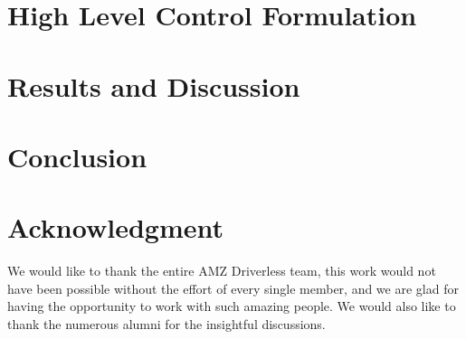 \documentclass[letterpaper, 10 pt, journal, twoside]{ieeetran}
\begin{document}
\section{High Level Control Formulation}
\label{sec:hlc_formulation}


\section{Results and Discussion}
\label{sec:results}


\section{Conclusion}
\label{sec:conclusion}



\section*{Acknowledgment}

We would like to thank the entire AMZ Driverless team, this work would not have been possible without the effort of every single member, and we are glad for having the opportunity to work with such amazing people. We would also like to thank the numerous alumni for the insightful discussions.




\end{document}
